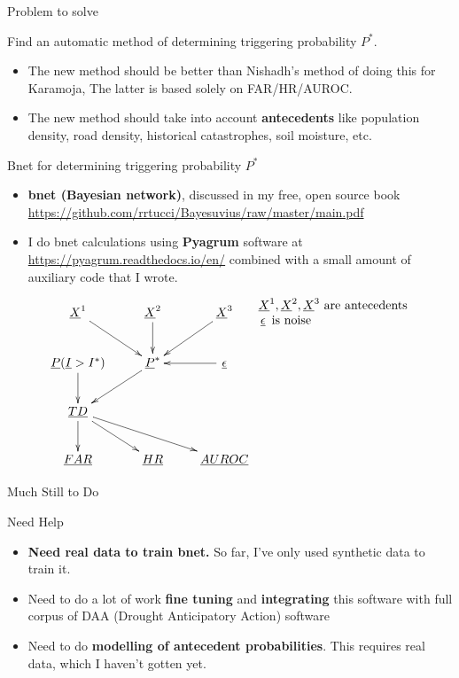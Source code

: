 \documentclass{beamer}
\begin{document}
\begin{frame}{Problem to solve}

Find an automatic method of determining triggering
 probability $P^*$. 
 \begin{itemize}

 \item The new method should be better than Nishadh's method of doing this for Karamoja, The latter is based solely on FAR/HR/AUROC. 
 
 \item The new method should take
 into account {\bf antecedents} like population density, road density, historical catastrophes, soil moisture, etc.
 \end{itemize}

\end{frame}

\begin{frame}{Bnet for determining triggering 
probability $P^*$}

\begin{itemize}
\item {\bf bnet (Bayesian network)}, discussed in my free,
open source book 
{\tiny \url{https://github.com/rrtucci/Bayesuvius/raw/master/main.pdf}}
\item I do bnet calculations using {\bf Pyagrum} software at {\tiny \url{https://pyagrum.readthedocs.io/en/}} combined with a small amount of auxiliary 
code that I wrote.
\end{itemize}


$$
\xymatrix{
\rvX^1 \ar[dr]
&\rvX^2 \ar[d]
&\rvX^3\ar[dl]
\\
\rvP(\rvI> I^*)\ar[d] 
& \rvP^*\ar[dl]
&\rv{\eps}\ar[l]
\\
\rv{TD}
\ar[d]\ar[dr]\ar[drr]
\\
\ul{FAR} 
&\ul{HR}
&\ul{AUROC}
}
\begin{array}{l}
\text{$\rvX^1, \rvX^2, \rvX^3$ are antecedents}
\\
\text{$\rv{\eps}$ is noise}
\end{array}
$$


\end{frame}

\begin{frame}{Much Still to Do}

{\color{red} Need Help}

\begin{itemize}
\item {\bf Need real data to train bnet. 
} So far, I've only used synthetic  data to train it. 

\item Need to do a lot of work {\bf fine tuning} and
{\bf integrating} 
this software with full corpus of DAA 
(Drought Anticipatory Action) software

\item Need to do {\bf modelling of 
antecedent  probabilities}. This requires real data, which I haven't gotten yet.

\end{itemize}

\end{frame}
\end{document}
